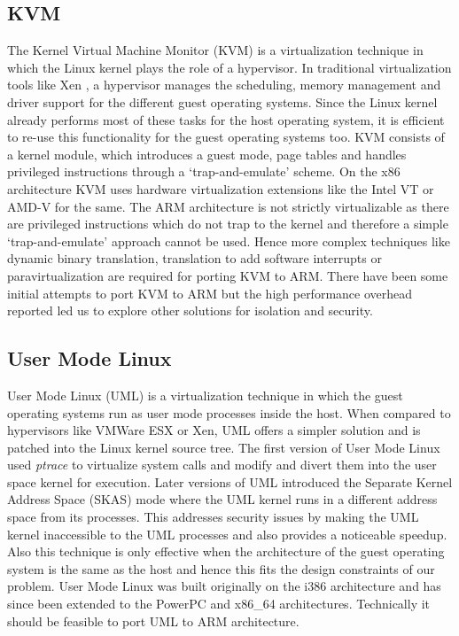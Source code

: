\subsection{KVM}
The Kernel Virtual Machine Monitor (KVM) is a virtualization technique in which the Linux kernel plays the role of a hypervisor. In traditional virtualization tools like Xen \cite{xen}, a hypervisor manages the scheduling, memory management and driver support for the different guest operating systems. Since the Linux kernel already performs most of these tasks for the host operating system, it is efficient to re-use this functionality for the guest operating systems too. KVM consists of a kernel module, which introduces a guest mode,  page tables and handles privileged instructions through a `trap-and-emulate' scheme. On the x86 architecture KVM uses hardware virtualization extensions like the Intel VT or AMD-V for the same. 
The ARM architecture is not strictly virtualizable as there are privileged instructions which do not trap to the kernel and therefore a simple `trap-and-emulate' approach cannot be used. Hence more complex techniques like dynamic binary translation, translation to add software interrupts or paravirtualization are required for porting KVM to ARM. There have been some initial attempts to port KVM to ARM \cite{columbia} but the high performance overhead reported led us to explore other solutions for isolation and security. 

\subsection{User Mode Linux}
User Mode Linux (UML) is a virtualization technique in which the guest operating systems run as user mode processes inside the host. When compared to hypervisors like VMWare ESX or Xen, UML offers a simpler solution and is patched into the Linux kernel source tree. The first version of User Mode Linux used \emph{ptrace} to virtualize system calls and modify and divert them into the user space kernel for execution. Later versions of UML introduced the Separate Kernel Address Space (SKAS) mode  where the UML kernel runs in a different address space from its processes. This addresses security issues by making the UML kernel inaccessible to the UML processes and also provides a noticeable speedup. Also this technique is only effective when the architecture of the guest operating system is the same as the host and hence this fits the design constraints of our problem. User Mode Linux was built originally on the i386 architecture and has since been extended to the PowerPC and x86\_64 architectures. Technically it should be feasible to port UML to ARM architecture. \\

